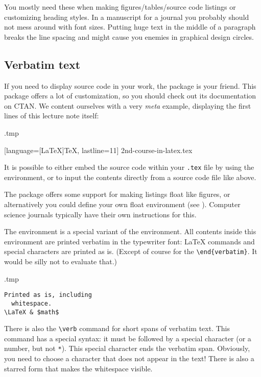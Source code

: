 You mostly need these when making figures/tables/source code listings
or customizing heading styles.
In a manuscript for a journal you probably should not mess around with font sizes.
Putting {\huge huge text} in the middle of a paragraph
breaks the line spacing and might cause you enemies in graphical design circles.


%
%
\subsection{Verbatim text}

If you need to display source code in your work,
the  package is your friend.
This package offers a lot of customization,
so you should check out its documentation on CTAN.
We content ourselves with a very \emph{meta} example,
displaying the first lines of this lecture note itself:
%
\begin{VerbatimOut}{\jobname.tmp}


  [language={[LaTeX]TeX}, lastline=11]
  {2nd-course-in-latex.tex}
\end{VerbatimOut}
\ShowExample
%
It is possible to either embed the source code within your \verb|.tex| file
by using the  environment,
or to input the contents directly from a source code file like above.

The package offers some support for making listings float like figures,
or alternatively you could define your own float environment (see ).
Computer science journals typically have their own instructions for this.

The  environment is a special variant of the  environment.
All contents inside this environment are printed verbatim
in the typewriter font: \LaTeX{} commands and special characters are printed as is.
(Except of course for the \verb|\end{verbatim}|.
It would be silly not to evaluate that.)

\begin{VerbatimOut}{\jobname.tmp}
\begin{verbatim}
Printed as is, including
  whitespace.
\LaTeX & $math$
\end{verbatim}
\end{VerbatimOut}
\ShowExample

There is also the \verb|\verb| command for short spans of verbatim text.
This command has a special syntax:
it must be followed by a special character (or a number, but not \verb|*|).
This special character ends the verbatim span.
Obviously, you need to choose a character that does not appear in the text!
There is also a starred form that makes the whitespace visible.

